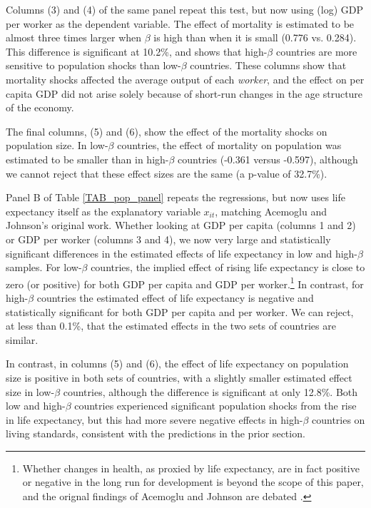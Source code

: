 \documentclass[11pt]{article}
\begin{document}
Columns (3) and (4) of the same panel repeat this test, but now using (log) GDP per worker as the dependent variable. The effect of mortality is estimated to be almost three times larger when $\beta$ is high than when it is small (0.776 vs. 0.284). This difference is significant at 10.2\%, and shows that high-$\beta$ countries are more sensitive to population shocks than low-$\beta$ countries. These columns show that mortality shocks affected the average output of each \textit{worker}, and the effect on per capita GDP did not arise solely because of short-run changes in the age structure of the economy.

The final columns, (5) and (6), show the effect of the mortality shocks on population size. In low-$\beta$ countries, the effect of mortality on population was estimated to be smaller than in high-$\beta$ countries (-0.361 versus -0.597), although we cannot reject that these effect sizes are the same (a p-value of 32.7\%). 

Panel B of Table \ref{TAB_pop_panel} repeats the regressions, but now uses life expectancy itself as the explanatory variable $x_{it}$, matching Acemoglu and Johnson's original work. Whether looking at GDP per capita (columns 1 and 2) or GDP per worker (columns 3 and 4), we now very large and statistically significant differences in the estimated effects of life expectancy in low and high-$\beta$ samples. For low-$\beta$ countries, the implied effect of rising life expectancy is close to zero (or positive) for both GDP per capita and GDP per worker.\footnote{Whether changes in health, as proxied by life expectancy, are in fact positive or negative in the long run for development is beyond the scope of this paper, and the orignal findings of Acemoglu and Johnson are debated \citep{bcf2014}.} In contrast, for high-$\beta$ countries the estimated effect of life expectancy is negative and statistically significant for both GDP per capita and per worker. We can reject, at less than 0.1\%, that the estimated effects in the two sets of countries are similar. 

In contrast, in columns (5) and (6), the effect of life expectancy on population size is positive in both sets of countries, with a slightly smaller estimated effect size in low-$\beta$ countries, although the difference is significant at only 12.8\%. Both low and high-$\beta$ countries experienced significant population shocks from the rise in life expectancy, but this had more severe negative effects in high-$\beta$ countries on living standards, consistent with the predictions in the prior section.
\end{document}
